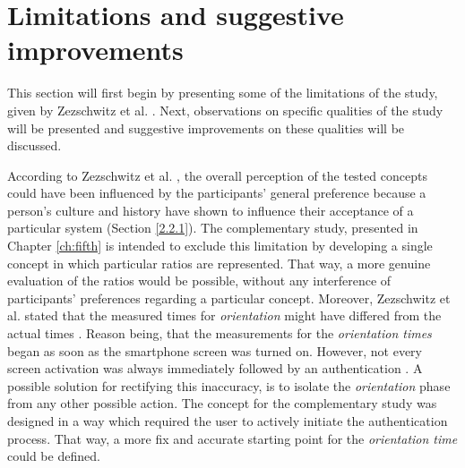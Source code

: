 \section{Limitations and suggestive improvements} \label{3.3}

This section will first begin by presenting some of the limitations of the study, given by Zezschwitz et al. \cite{Zezschwitz}. Next, observations on specific qualities of the study will be presented and suggestive improvements on these qualities will be discussed. 

According to Zezschwitz et al. \cite{Zezschwitz}, the overall perception of the tested concepts could have been influenced by the participants' general preference \cite{Zezschwitz} because a person's culture and history have shown to influence their acceptance of a particular system \cite{Harbach:2016} (Section \ref{2.2.1}). The complementary study, presented in Chapter \ref{ch:fifth} is intended to exclude this limitation by developing a single concept in which particular ratios are represented. That way, a more genuine evaluation of the ratios would be possible, without any interference of participants' preferences regarding a particular concept. Moreover, Zezschwitz et al. \cite{Zezschwitz} stated that the measured times for \textit{orientation} might have differed from the actual times \cite{Zezschwitz}. Reason being, that the measurements for the \textit{orientation times} began as soon as the smartphone screen was turned on. However, not every screen activation was always immediately followed by an authentication \cite{Zezschwitz}. A possible solution for rectifying this inaccuracy, is to isolate the \textit{orientation} phase from any other possible action. The concept for the complementary study was designed in a way which required the user to actively initiate the authentication process. That way, a more fix and accurate starting point for the \textit{orientation time} could be defined.\\

